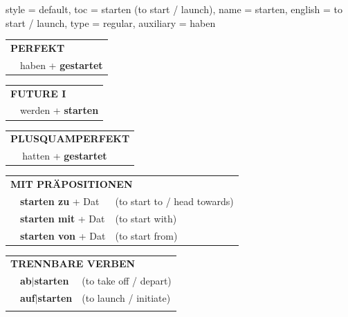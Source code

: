 \begin{verbentry}{
  style = {default},
  toc = {starten (to start / launch)},
  name = {starten},
  english = {to start / launch},
  type = {regular},
  auxiliary = {haben}
}
 \begin{tabular}{rl}
     \multicolumn{2}{l}{\textbf{PERFEKT}}\\
   & haben + \textbf{gestartet}\\
  \end{tabular}
\hfill
\begin{tabular}{rl}
    \multicolumn{2}{l}{\textbf{FUTURE I}}\\
   & werden + \textbf{starten}\\
  \end{tabular}
\hfill
\begin{tabular}{rl}
    \multicolumn{2}{l}{\textbf{PLUSQUAMPERFEKT}}\\
   & hatten + \textbf{gestartet}\\
  \end{tabular}

 \vspace{10pt}

\begin{tabular}{lll}
      \multicolumn{3}{l}{\textbf{MIT PRÄPOSITIONEN}}\\
& \textbf{starten zu} + Dat & (to start to / head towards)\\
& \textbf{starten mit} + Dat & (to start with)\\
& \textbf{starten von} + Dat & (to start from)\\
\end{tabular}
  \hfill
\begin{tabular}{lll}
      \multicolumn{3}{l}{\textbf{TRENNBARE VERBEN}}\\
 & \textbf{ab$|$starten} & (to take off / depart)\\
 & \textbf{auf$|$starten} & (to launch / initiate)\\
\vspace{10pt}
  \end{tabular}


\vspace{-5pt}
\end{verbentry}

